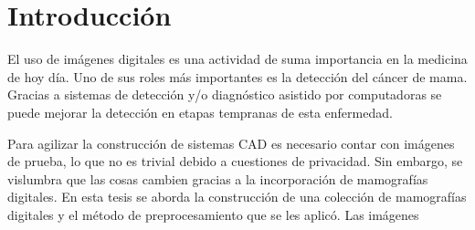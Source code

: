 \newpage
{}
\chapter*{Introducción}

El uso de imágenes digitales es una actividad de suma importancia en la
medicina de hoy día. Uno de sus roles más importantes es la detección del
cáncer de mama. Gracias a sistemas de detección y/o diagnóstico asistido por
computadoras se puede mejorar la detección en etapas tempranas de esta
enfermedad.

Para agilizar la construcción de sistemas CAD es necesario contar con imágenes
de prueba, lo que no es trivial debido a cuestiones de privacidad. Sin embargo,
se vislumbra que las cosas cambien gracias a la incorporación de mamografías
digitales. En esta tesis se aborda la construcción de una colección de
mamografías digitales y el método de preprocesamiento que se les aplicó. Las
imágenes


